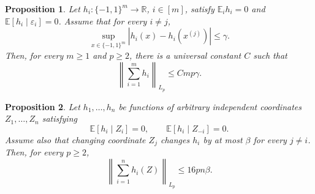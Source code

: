 \documentclass[10pt,a4paper]{amsart}
\newtheorem{proposition}{Proposition}
\newcommand{\E}{\mathbb{E}}
\newcommand{\abs}[1]{\left\lvert #1\right\rvert}
\newcommand{\norm}[1]{\left\lVert #1\right\rVert}
\begin{document}
\begin{proposition}\label{prop:cube}
Let $h_i:\{-1,1\}^m\to\mathbb R$, $i\in[m]$, satisfy \(\E_i h_i=0\) and \( \E[h_i\mid\varepsilon_i]=0 \). Assume that for every $i\neq j$,
\[
\sup_{x\in\{-1,1\}^m} \abs{h_i(x)-h_i(x^{(j)})} \le\gamma.
\]
Then, for every $m\ge1$ and $p\ge2$, there is a universal constant $C$ such that
\[
\norm{\sum_{i=1}^m h_i}_{L_p} \le Cmp\gamma.
\]
\end{proposition}

\begin{proposition}\label{prop:transfer}
Let $h_1,\ldots,h_n$ be functions of arbitrary independent coordinates $Z_1,\ldots,Z_n$ satisfying
\begin{equation}\label{eq:double-center}
\E[h_i\mid Z_i]=0,
\qquad
\E[h_i\mid Z_{-i}]=0.
\end{equation}
Assume also that changing coordinate $Z_j$ changes $h_i$ by at most $\beta$ for every $j\neq i$.
Then, for every $p\ge2$,
\[
\norm{\sum_{i=1}^n h_i(Z)}_{L_p} \le 16pn\beta.
\]
\end{proposition}
\end{document}
